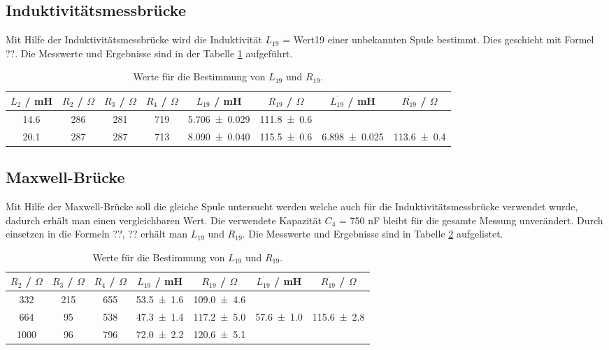 \subsection{Induktivitätsmessbrücke}
Mit Hilfe der Induktivitätsmessbrücke wird die Induktivität $L_{19}$ = Wert19 einer unbekannten Spule bestimmt. Dies geschieht mit Formel ??. Die Messwerte und Ergebnisse sind in der Tabelle \ref{tab:Induk1} aufgeführt.
\begin{table}[H]
  \centering
  \begin{tabular}{c c c c c c c c}
    \toprule
    $L_2$ / mH & $R_2$ / $\Omega$ & $R_3$ / $\Omega$ & $R_4$ / $\Omega$ & $L_{19}$ / mH & $R_{19}$ / $\Omega$ & $\overline{L_{19}}$ / mH & $\overline{R_{19}}$ / $\Omega$ \\
    \midrule
    14.6 & 286 & 281 & 719 & \num{5.706 +- 0.029} & \num{111.8 +- 0.6} & & \\
    20.1 & 287 & 287 & 713 & \num{8.090 +- 0.040} & \num{115.5 +- 0.6} & \num{6.898 +- 0.025} & \num{113.6 +- 0.4} \\
  \end{tabular}
  \caption{Werte für die Bestimmung von $L_{19}$ und $R_{19}$.}
  \label{tab:Induk1}
\end{table}

\subsection{Maxwell-Brücke}
Mit Hilfe der Maxwell-Brücke soll die gleiche Spule untersucht werden welche auch für die Induktivitätsmessbrücke verwendet wurde, dadurch erhält man einen vergleichbaren Wert. Die verwendete Kapazität $C_4$ = 750 nF bleibt für die gesamte Messung unverändert. Durch einsetzen in die Formeln ??, ?? erhält man $L_{19}$ und $R_{19}$. Die Messwerte und Ergebnisse sind in Tabelle \ref{tab:Induk2} aufgelistet.

\begin{table}[H]
  \centering
  \begin{tabular}{c c c c c c c}
    \toprule
    $R_2$ / $\Omega$ & $R_3$ / $\Omega$ & $R_4$ / $\Omega$ & $L_{19}$ / mH & $R_{19}$ / $\Omega$ & $\overline{L_{19}}$ / mH & $\overline{R_{19}}$ / $\Omega$ \\
    \midrule
    332 & 215 & 655 & \num{53.5 +- 1.6} & \num{109.0 +- 4.6} & & \\
    664 & 95 & 538 & \num{47.3 +- 1.4} & \num{117.2 +- 5.0} & \num{57.6 +- 1.0} & \num{115.6 +- 2.8} \\
    1000 & 96 & 796 & \num{72.0 +- 2.2} & \num{120.6 +- 5.1} & & \\
  \end{tabular}
  \caption{Werte für die Bestimmung von $L_{19}$ und $R_{19}$.}
  \label{tab:Induk2}
\end{table}

